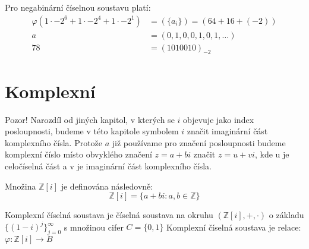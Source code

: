 \documentclass[czech,bachelor,dept470,male]{diploma}
\begin{document}
\begin{example}
	Pro negabinární číselnou soustavu platí:
	\begin{align}
	\varphi(1\cdot-2^6+1\cdot-2^4+1\cdot-2^1)&=(\{a_i\})=(64+16+(-2))\nonumber\\
	a&=(0,1,0,0,1,0,1,\dots) \nonumber\\
	78 &=(1010010)_{-2}\nonumber
	\end{align}
\end{example}

\section{Komplexní}

\begin{agreement}
	Pozor! Narozdíl od jiných kapitol, v kterých se $i$ objevuje jako index posloupnosti, budeme v této kapitole symbolem $i$ značit imaginární část komplexního čísla.\newline
	Protože $a$ již používame pro značení posloupnosti budeme komplexní číslo místo obvyklého značení $z = a +bi$ značit $z=u+vi$, kde u je celočíselná část a v je imaginární část komplexního čísla.
\end{agreement}

\begin{definition}
	Množina $\mathbb{Z}[i]$ je definována následovně:
	$$ \mathbb{Z}[i]=\{a+bi:a,b\in\mathbb{Z}\}$$
	\cite{b}
\end{definition}

\begin{definition}
	Komplexní číselná soustava je číselná soustava na okruhu $(\mathbb{Z}[i],+,\cdot)$ o základu $\{(1-i)^j\}_{j=0}^\infty$ s množinou cifer $C=\{0,1\}$\newline
	\newline
	Komplexní číselná soustava je relace:
	$\varphi:\mathbb{Z}[i]\to B$
\end{definition}
\end{document}
